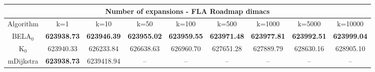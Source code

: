 \begin{tabular}{c|cccccccc}\toprule
\multicolumn{9}{c}{Number of expansions - FLA Roadmap dimacs}\\ \midrule
Algorithm & k=1 & k=10 & k=50 & k=100 & k=500 & k=1000 & k=5000 & k=10000 \\ \midrule
BELA$_0$ & \textbf{623938.73} & \textbf{623946.39} & \textbf{623955.02} & \textbf{623959.55} & \textbf{623971.48} & \textbf{623977.81} & \textbf{623992.51} & \textbf{623999.04} \\
K$_0$ & 623940.33 & 626233.84 & 626638.63 & 626960.70 & 627651.28 & 627889.79 & 628630.16 & 628905.10 \\
mDijkstra & \textbf{623938.73} & 6239418.94 & -- & -- & -- & -- & -- & -- \\ \bottomrule 
\end{tabular}
